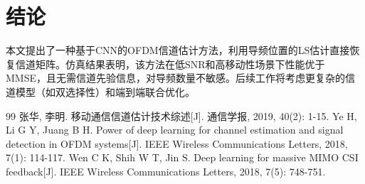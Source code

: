 \documentclass[twocolumn]{ctexart}
\begin{document}
\section{结论}

本文提出了一种基于CNN的OFDM信道估计方法，利用导频位置的LS估计直接恢复信道矩阵。仿真结果表明，该方法在低SNR和高移动性场景下性能优于MMSE，且无需信道先验信息，对导频数量不敏感。后续工作将考虑更复杂的信道模型（如双选择性）和端到端联合优化。


\begin{thebibliography}{99}
 张华, 李明. 移动通信信道估计技术综述[J]. 通信学报, 2019, 40(2): 1-15.
 Ye H, Li G Y, Juang B H. Power of deep learning for channel estimation and signal detection in OFDM systems[J]. IEEE Wireless Communications Letters, 2018, 7(1): 114-117.
 Wen C K, Shih W T, Jin S. Deep learning for massive MIMO CSI feedback[J]. IEEE Wireless Communications Letters, 2018, 7(5): 748-751.
\end{thebibliography}
\end{document}
